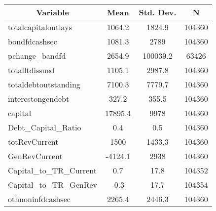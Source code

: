 \begin{tabular}{l c c  c}\hline\hline
\multicolumn{1}{c}{\textbf{Variable}} & \textbf{Mean}
 & \textbf{Std. Dev.} & \textbf{N}\\ \hline
totalcapitaloutlays & 1064.2 & 1824.9  & 104360\\
bondfdcashsec & 1081.3 & 2789  & 104360\\
pchange\_bandfd & 2654.9 & 100039.2  & 63426\\
totalltdissued & 1105.1 & 2987.8  & 104360\\
totaldebtoutstanding & 7100.3 & 7779.7  & 104360\\
interestongendebt & 327.2 & 355.5  & 104360\\
capital & 17895.4 & 9978  & 104360\\
Debt\_Capital\_Ratio & 0.4 & 0.5  & 104360\\
totRevCurrent & 1500 & 1433.3  & 104360\\
GenRevCurrent & -4124.1 & 2938  & 104360\\
Capital\_to\_TR\_Current & 0.7 & 17.8  & 104352\\
Capital\_to\_TR\_GenRev & -0.3 & 17.7  & 104354\\
othnoninfdcashsec & 2265.4 & 2446.3  & 104360\\
\hline\end{tabular}

